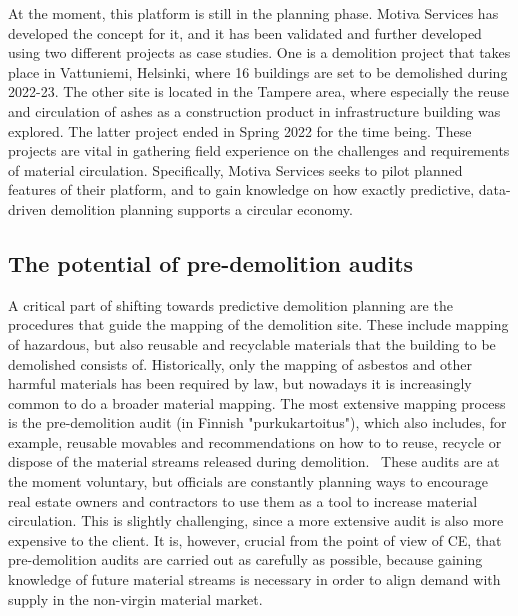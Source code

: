 \documentclass[english, 12pt, a4paper, sci, utf8, a-2b, online]{aaltothesis}
\begin{document}
At the moment, this platform is still in the planning phase. Motiva Services has developed the concept for it, and it has been validated and further developed using two different projects as
case studies. One is a demolition project that takes place in Vattuniemi, Helsinki, where 16 buildings are set to be demolished during 2022-23. The other site is located in the
Tampere area, where especially the reuse and circulation of ashes as a construction product in infrastructure building was explored. The latter project ended in Spring 2022 for the time being.
These projects are vital in gathering field experience on the challenges and requirements of material circulation. Specifically, Motiva Services seeks to pilot planned features of their platform,
and to gain knowledge on how exactly predictive, data-driven demolition planning supports a circular economy.

\subsection{The potential of pre-demolition audits} \label{pre_dem}

A critical part of shifting towards predictive demolition planning are the procedures that guide the mapping of the demolition site. These include mapping of hazardous, but also reusable
and recyclable materials that the building to be demolished consists of. Historically, only the mapping of asbestos and other harmful materials has been required by law, but nowadays it is increasingly
common to do a broader material mapping. The most extensive mapping process is the pre-demolition audit (in Finnish "purkukartoitus"), which also includes, for example, reusable movables and
recommendations on how to to reuse, recycle or dispose of the material streams released during demolition.~\cite{lehtonen} These audits are at the moment voluntary, but officials are constantly planning ways to
encourage real estate owners and contractors to use them as a tool to increase material circulation. This is slightly challenging, since a more extensive audit is also more expensive to the client.
It is, however, crucial from the point of view of CE, that pre-demolition audits are carried out as carefully as possible, because gaining knowledge of future material streams is necessary in
order to align demand with supply in the non-virgin material market.
\end{document}
